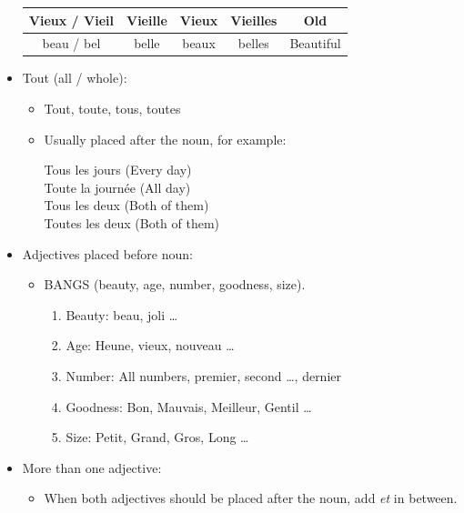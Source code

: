 \documentclass{book}
\begin{document}
\begin{itemize}
\begin{center}
\begin{tabular}{|c|c|c|c|c|}
                    \hline
                    Vieux / Vieil & Vieille & Vieux & Vieilles & Old \\
                    \hline
                    beau / bel & belle & beaux & belles & Beautiful \\
                    \hline
                \end{tabular}
            \end{center}
        \item Tout (all / whole): 
            \begin{itemize}
                \item Tout, toute, tous, toutes
                \item Usually placed after the noun, for example:
                    \begin{center}
                        Tous les jours (Every day) \\
                        Toute la journée (All day) \\
                        Tous les deux (Both of them) \\
                        Toutes les deux (Both of them)
                    \end{center}
            \end{itemize}
        \item Adjectives placed before noun:
            \begin{itemize}
                \item BANGS (beauty, age, number, goodness, size).
                    \begin{enumerate}
                        \item Beauty: beau, joli \dots
                        \item Age: Heune, vieux, nouveau \dots
                        \item Number: All numbers, premier, second \dots, dernier
                        \item Goodness: Bon, Mauvais, Meilleur, Gentil \dots
                        \item Size: Petit, Grand, Gros, Long \dots
                    \end{enumerate}
            \end{itemize}
        \item More than one adjective:
            \begin{itemize}
                \item When both adjectives should be placed after the noun, add \textit{et} in between.

\end{itemize}
\end{itemize}
\end{document}
